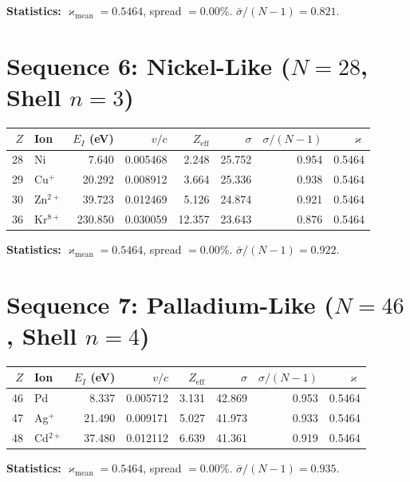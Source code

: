 \documentclass{article}
\newcommand{\kop}{\varkappa}
\begin{document}
\textbf{Statistics:} $\kop_{\text{mean}} = 0.5464$, spread $= 0.00\%$.  $\bar{\sigma}/(N{-}1) = 0.821$.


\section{Sequence 6: Nickel-Like ($N = 28$, Shell $n = 3$)}

\begin{center}
\begin{tabular}{rlrrrrrr}
\toprule
$Z$ & Ion & $E_I$ (eV) & $v/c$ & $Z_{\text{eff}}$ & $\sigma$ & $\sigma/(N{-}1)$ & $\kop$ \\
\midrule
28 & Ni          &    7.640 & 0.005468 &  2.248 & 25.752 & 0.954 & 0.5464 \\
29 & Cu$^+$      &   20.292 & 0.008912 &  3.664 & 25.336 & 0.938 & 0.5464 \\
30 & Zn$^{2+}$   &   39.723 & 0.012469 &  5.126 & 24.874 & 0.921 & 0.5464 \\
36 & Kr$^{8+}$   &  230.850 & 0.030059 & 12.357 & 23.643 & 0.876 & 0.5464 \\
\bottomrule
\end{tabular}
\end{center}

\textbf{Statistics:} $\kop_{\text{mean}} = 0.5464$, spread $= 0.00\%$.  $\bar{\sigma}/(N{-}1) = 0.922$.


\section{Sequence 7: Palladium-Like ($N = 46$, Shell $n = 4$)}

\begin{center}
\begin{tabular}{rlrrrrrr}
\toprule
$Z$ & Ion & $E_I$ (eV) & $v/c$ & $Z_{\text{eff}}$ & $\sigma$ & $\sigma/(N{-}1)$ & $\kop$ \\
\midrule
46 & Pd          &    8.337 & 0.005712 &  3.131 & 42.869 & 0.953 & 0.5464 \\
47 & Ag$^+$      &   21.490 & 0.009171 &  5.027 & 41.973 & 0.933 & 0.5464 \\
48 & Cd$^{2+}$   &   37.480 & 0.012112 &  6.639 & 41.361 & 0.919 & 0.5464 \\
\bottomrule
\end{tabular}
\end{center}

\textbf{Statistics:} $\kop_{\text{mean}} = 0.5464$, spread $= 0.00\%$.  $\bar{\sigma}/(N{-}1) = 0.935$.
\end{document}
